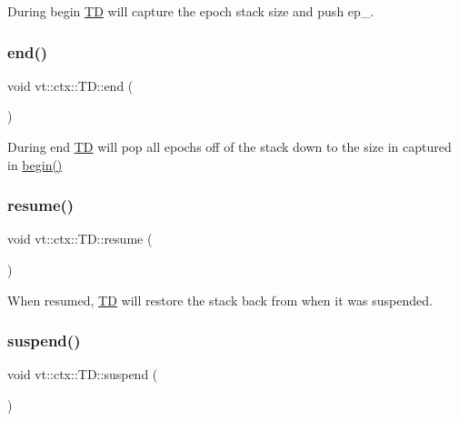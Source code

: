 During begin {\ttfamily \hyperlink{structvt_1_1ctx_1_1_t_d}{TD}} will capture the epoch stack size and push {\ttfamily ep\+\_\+}. 

\mbox{\label{structvt_1_1ctx_1_1_t_d_a84ec814281906256db4ebc71fa2a435a}} 
\subsubsection{\texorpdfstring{end()}{end()}}
{\footnotesize\ttfamily void vt\+::ctx\+::\+T\+D\+::end (\begin{DoxyParamCaption}{ }\end{DoxyParamCaption})}



During end {\ttfamily \hyperlink{structvt_1_1ctx_1_1_t_d}{TD}} will pop all epochs off of the stack down to the size in captured in {\ttfamily \hyperlink{structvt_1_1ctx_1_1_t_d_a1560e74cce475bbc650f03b91bf6274e}{begin()}} 

\mbox{\label{structvt_1_1ctx_1_1_t_d_a0092946ebad71b2518fa8fa5a7eeb3f2}} 
\subsubsection{\texorpdfstring{resume()}{resume()}}
{\footnotesize\ttfamily void vt\+::ctx\+::\+T\+D\+::resume (\begin{DoxyParamCaption}{ }\end{DoxyParamCaption})}



When resumed, {\ttfamily \hyperlink{structvt_1_1ctx_1_1_t_d}{TD}} will restore the stack back from when it was suspended. 

\mbox{\label{structvt_1_1ctx_1_1_t_d_ab66a4c01265c0c43d95d0084ea8c5ff9}} 
\subsubsection{\texorpdfstring{suspend()}{suspend()}}
{\footnotesize\ttfamily void vt\+::ctx\+::\+T\+D\+::suspend (\begin{DoxyParamCaption}{ }\end{DoxyParamCaption})}



